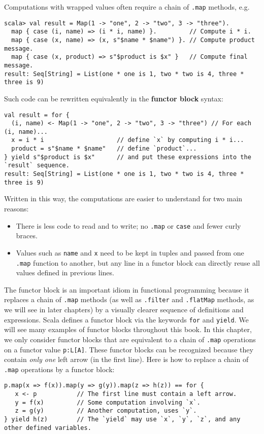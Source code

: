 Computations with wrapped values often require a chain of \lstinline!.map!
methods, e.g.
\begin{lstlisting}
scala> val result = Map(1 -> "one", 2 -> "two", 3 -> "three").
  map { case (i, name) => (i * i, name) }.         // Compute i * i.
  map { case (x, name) => (x, s"$name * $name") }. // Compute product message.
  map { case (x, product) => s"$product is $x" }   // Compute final message.
result: Seq[String] = List(one * one is 1, two * two is 4, three * three is 9)
\end{lstlisting}
Such code can be rewritten equivalently in the \textbf{functor
block} syntax:
\begin{lstlisting}
val result = for {
  (i, name) <- Map(1 -> "one", 2 -> "two", 3 -> "three") // For each (i, name)...
  x = i * i                    // define `x` by computing i * i...
  product = s"$name * $name"   // define `product`...
} yield s"$product is $x"      // and put these expressions into the `result` sequence.
result: Seq[String] = List(one * one is 1, two * two is 4, three * three is 9) 
\end{lstlisting}
Written in this way, the computations are easier to understand for
two main reasons:
\begin{itemize}
\item There is less code to read and to write; no \lstinline!.map! or \lstinline!case!
and fewer curly braces.
\item Values such as \lstinline!name! and \lstinline!x! need to be kept
in tuples and passed from one \lstinline!.map! function to another,
but any line in a functor block can directly reuse all values defined
in previous lines.
\end{itemize}
The functor block is an important idiom in functional programming
because it replaces a chain of \lstinline!.map! methods (as well
as \lstinline!.filter! and \lstinline!.flatMap! methods, as we will
see in later chapters) by a visually clearer sequence of definitions
and expressions. Scala defines a functor block via the keywords \lstinline!for!
and \lstinline!yield!. We will see many examples of functor blocks
throughout this book. In this chapter, we only consider functor blocks
that are equivalent to a chain of \lstinline!.map! operations on
a functor value \lstinline!p:L[A]!. These functor blocks can be recognized
because they contain \emph{only one} left arrow (in the first line).
Here is how to replace a chain of \lstinline!.map! operations by
a functor block:
\begin{lstlisting}
p.map(x => f(x)).map(y => g(y)).map(z => h(z)) == for {
   x <- p           // The first line must contain a left arrow.
   y = f(x)         // Some computation involving `x`.
   z = g(y)         // Another computation, uses `y`.
} yield h(z)        // The `yield` may use `x`, `y`, `z`, and any other defined variables.
\end{lstlisting}
